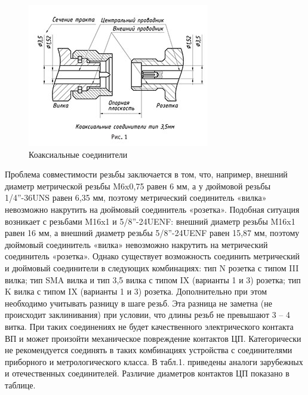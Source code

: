 \documentclass[%
	11pt,
	a4paper,
	utf8,
		]{article}
\begin{document}
\begin{figure}[h]
	\centering
	\includegraphics[scale=0.8]{figures/type_3.5.jpg}
	\caption{Коаксиальные соединители}\label{fig:type3_5}
\end{figure}

Проблема совместимости резьбы заключается в том, что, например, внешний диаметр метрической резьбы M6x0,75 равен 6 мм, а у дюймовой резьбы 1/4''-36UNS равен 6,35 мм, поэтому метрический соединитель «вилка» невозможно накрутить на дюймовый соединитель «розетка». Подобная ситуация возникает с резьбами M16x1 и 5/8''-24UENF: внешний диаметр резьбы M16x1 равен 16 мм, а внешний диаметр резьбы 5/8''-24UENF равен 15,87 мм, поэтому дюймовый соединитель «вилка» невозможно накрутить на метрический соединитель «розетка». Однако существует возможность соединить метрический и дюймовый соединители в следующих комбинациях: тип N розетка с типом III вилка; тип SMA вилка и тип 3,5 вилка с типом IX (варианты 1 и 3) розетка; тип K вилка с типом IX (варианты 1 и 3) розетка. Дополнительно при этом необходимо учитывать разницу в шаге резьб. Эта разница не заметна (не происходит заклинивания) при условии, что длины резьб не превышают 3 – 4 витка. При таких соединениях не будет качественного электрического контакта ВП и может произойти механическое повреждение контактов ЦП. Категорически не рекомендуется соединять в таких комбинациях устройства с соединителями приборного и метрологического класса. В табл.1. приведены аналоги зарубежных и отечественных соединителей. Различие диаметров контактов ЦП показано в таблице.
\end{document}
